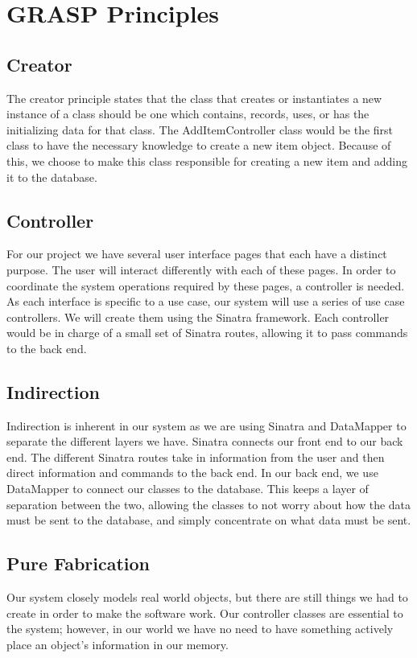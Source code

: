 \documentclass{article}
\begin{document}
\section{GRASP Principles}
\subsection{Creator}
The creator principle states that the class that creates or instantiates a new instance of a class should be one which contains, records, uses, or has the initializing data for that class. The AddItemController class would be the first class to have the necessary knowledge to create a new item object. Because of this, we choose to make this class responsible for creating a new item and adding it to the database.\\
\subsection{Controller}
For our project we have several user interface pages that each have a distinct purpose. The user will interact differently with each of these pages. In order to coordinate the system operations required by these pages, a controller is needed. As each interface is specific to a use case, our system will use a series of use case controllers. We will create them using the Sinatra framework. Each controller would be in charge of a small set of Sinatra routes, allowing it to pass commands to the back end.\\
\subsection{Indirection}
Indirection is inherent in our system as we are using Sinatra and DataMapper to separate the different layers we have. Sinatra connects our front end to our back end. The different Sinatra routes take in information from the user and then direct information and commands to the back end. In our back end, we use DataMapper to connect our classes to the database. This keeps a layer of separation between the two, allowing the classes to not worry about how the data must be sent to the database, and simply concentrate on what data must be sent.\\
\subsection{Pure Fabrication}
Our system closely models real world objects, but there are still things we had to create in order to make the software work. Our controller classes are essential to the system; however, in our world we have no need to have something actively place an object's information in our memory.\\
\end{document}
